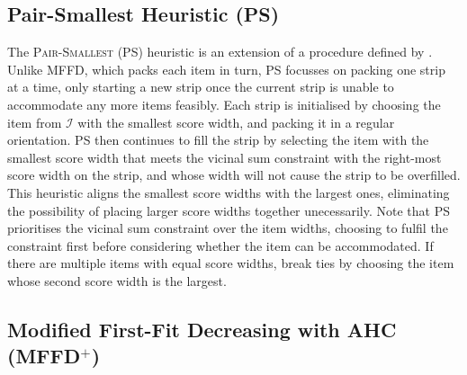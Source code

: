\documentclass[oribibl]{llncs}
\begin{document}
\subsection{Pair-Smallest Heuristic (PS)}
\label{sec:ps}

The \textsc{Pair-Smallest} (PS) heuristic is an extension of a procedure defined by \cite{lewis2011}. Unlike MFFD, which packs each item in turn, PS focusses on packing one strip at a time, only starting a new strip once the current strip is unable to accommodate any more items feasibly. Each strip is initialised by choosing the item from $\mathcal{I}$ with the smallest score width, and packing it in a regular orientation. PS then continues to fill the strip by selecting the item with the smallest score width that meets the vicinal sum constraint with the right-most score width on the strip, and whose width will not cause the strip to be overfilled. This heuristic aligns the smallest score widths with the largest ones, eliminating the possibility of placing larger score widths together unecessarily. Note that PS prioritises the vicinal sum constraint over the item widths, choosing to fulfil the constraint first before considering whether the item can be accommodated. If there are multiple items with equal score widths, break ties by choosing the item whose second score width is the largest.



\subsection{Modified First-Fit Decreasing with AHC (MFFD$^+$)}
\label{sec:mffd+}
\end{document}
